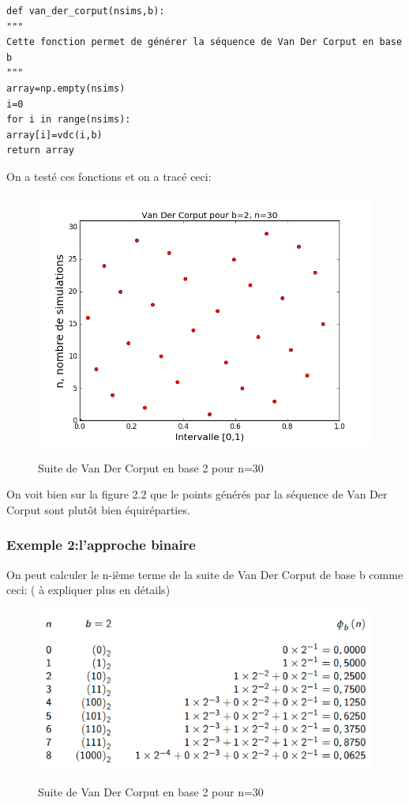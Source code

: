 \documentclass[12pt]{report}
\begin{document}
\begin{lstlisting}
def van_der_corput(nsims,b):
"""
Cette fonction permet de générer la séquence de Van Der Corput en base b
"""
array=np.empty(nsims)
i=0
for i in range(nsims):
array[i]=vdc(i,b)
return array
\end{lstlisting}
On a testé ces fonctions et on a tracé ceci:\\
\begin{figure}[h]
	\begin{center}
		\includegraphics[scale=0.5]{figure_1-van_der_corput_exemple1.png}\\
	\end{center}
	\caption{Suite de Van Der Corput en base 2 pour n=30}
\end{figure}
\medbreak
On voit bien sur la figure 2.2 que le points générés par la séquence de Van Der Corput sont plutôt bien équiréparties.
\subsubsection{Exemple 2:l'approche binaire}
On peut calculer le n-ième terme de la suite de Van Der Corput de base b comme ceci: ( à expliquer plus en détails)
\begin{figure}[h]
	\begin{center}
		\includegraphics[scale=0.5]{figure2.3-van_der_corput_binaire.png}\\
	\end{center}
	\caption{Suite de Van Der Corput en base 2 pour n=30}
\end{figure}
\end{document}
